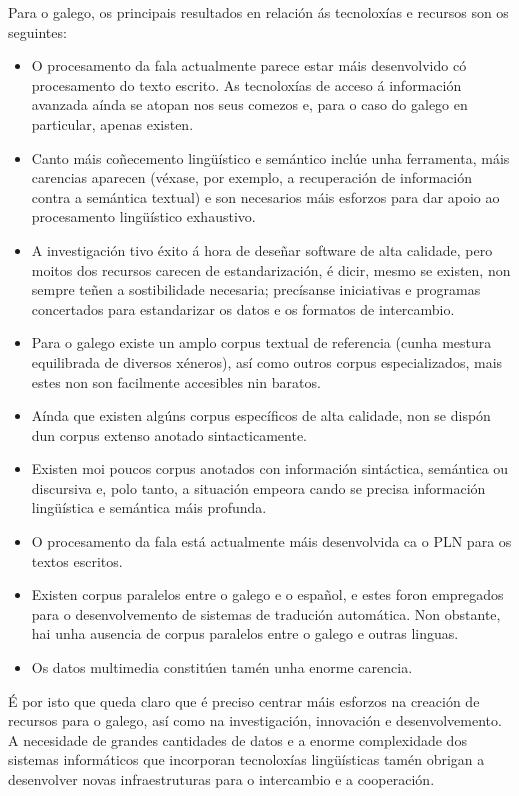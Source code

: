 \begin{multicols}{2}
Para o galego, os principais resultados en relación ás tecnoloxías e recursos son os seguintes:
	\begin{itemize}
		\item O procesamento da fala actualmente parece estar máis desenvolvido có procesamento do texto escrito. As tecnoloxías de acceso á información avanzada aínda se atopan nos seus comezos e, para o caso do galego en particular, apenas existen.
		\item Canto máis coñecemento lingüístico e semántico inclúe unha ferramenta, máis carencias aparecen (véxase, por exemplo, a recuperación de información contra a semántica textual) e son necesarios máis esforzos para dar apoio ao procesamento lingüístico exhaustivo. 
		\item A investigación tivo éxito á hora de deseñar software de alta calidade, pero moitos dos recursos carecen de estandarización, é dicir, mesmo se existen, non sempre teñen a sostibilidade necesaria; precísanse iniciativas e programas concertados para estandarizar os datos e os formatos de intercambio.
		\item	Para o galego existe un amplo corpus textual de referencia (cunha mestura equilibrada de diversos xéneros), así como outros corpus especializados, mais estes non son facilmente accesibles nin baratos.
		\item Aínda que existen algúns corpus específicos de alta calidade, non se dispón dun corpus extenso anotado sintacticamente.
		\item Existen moi poucos corpus anotados con información sintáctica, semántica ou discursiva e, polo tanto, a situación empeora cando se precisa información lingüística e semántica máis profunda.
		\item O procesamento da fala está actualmente máis desenvolvida ca o PLN para os textos escritos.
		\item Existen corpus paralelos entre o galego e o español, e estes foron empregados para o desenvolvemento de sistemas de tradución automática. Non obstante, hai unha ausencia de corpus paralelos entre o galego e outras linguas.
		\item Os datos multimedia constitúen tamén unha enorme carencia.
 	\end{itemize}
É por isto que queda claro que é preciso centrar máis esforzos na creación de recursos para o galego, así como na investigación, innovación e desenvolvemento. A necesidade de grandes cantidades de datos e a enorme complexidade dos sistemas informáticos que incorporan tecnoloxías lingüísticas tamén obrigan a desenvolver novas infraestruturas para o intercambio e a cooperación.


\end{multicols}
